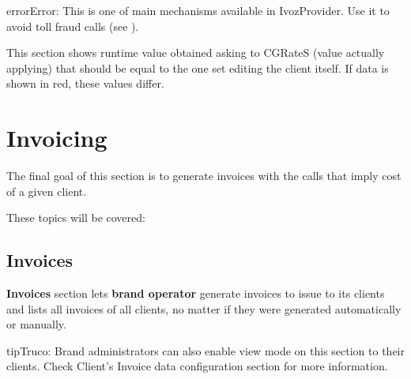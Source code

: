 \documentclass[letterpaper,10pt,spanish]{sphinxmanual}
\begin{document}
\begin{notice}{error}{Error:}
This is one of main {\hyperref[security_and_maintenance/security/index:security]{}} mechanisms available in IvozProvider. Use it to avoid toll fraud calls
(see {\hyperref[security_and_maintenance/security/current_day_max_usage:current\string-day\string-max\string-usage]{}}).
\end{notice}

This section shows runtime value obtained asking to CGRateS (value actually applying) that should be equal to the one
set editing the client itself. If data is shown in red, these values differ.


\section{Invoicing}
\label{administration_portal/brand/invoicing/index::doc}\label{administration_portal/brand/invoicing/index:invoicing}
The final goal of this section is to generate invoices with the calls that imply
cost of a given client.

These topics will be covered:


\subsection{Invoices}
\label{administration_portal/brand/invoicing/invoices:invoices}\label{administration_portal/brand/invoicing/invoices::doc}\label{administration_portal/brand/invoicing/invoices:id1}
\textbf{Invoices} section lets \textbf{brand operator} generate invoices to issue to its clients and lists all invoices of all
clients, no matter if they were generated automatically or manually.

\begin{notice}{tip}{Truco:}
Brand administrators can also enable view mode on this section to their clients. Check Client's Invoice data
configuration section for more information.
\end{notice}
\end{document}

